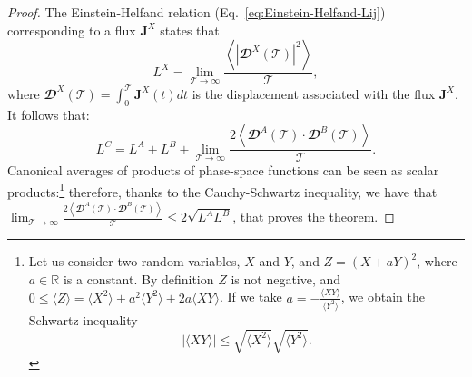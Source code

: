 \begin{proof}
The Einstein-Helfand relation (Eq.~\eqref{eq:Einstein-Helfand-Lij}) corresponding to a flux $\mathbf{J}^X$ states that 
\begin{equation}
    L^{X} = \lim_{\mathcal{T}\rightarrow\infty} \frac{\left\langle|\mathbfcal{D}^X(\mathcal{T})|^2\right\rangle} {\mathcal{T}},
\end{equation}
where $\mathbfcal{D}^X(\mathcal{T})=\int_0^{\mathcal{T}} \mathbf{J}^X(t) dt$ is the displacement associated with the flux $\mathbf{J}^X$. It follows that:
\begin{equation}
    L^{C} = L^{A} + L^{B} + \lim_{\mathcal{T}\rightarrow\infty} \frac{2\left\langle \mathbfcal{D}^A(\mathcal{T}) \cdot \mathbfcal{D}^B(\mathcal{T})\right\rangle}{\mathcal{T}}.
\end{equation}
Canonical averages of products of phase-space functions can be seen as scalar products:\footnote{Let us consider two random variables, $X$ and $Y$, and $Z=(X+aY)^2$, where $a\in \mathbb{R}$ is a constant. By definition $Z$ is not negative, and $0\leq \langle Z \rangle = \langle X^2 \rangle + a^2 \langle Y^2 \rangle + 2a \langle XY \rangle$. If we take $a = -\frac{\langle XY \rangle}{\langle Y^2 \rangle}$, we obtain the Schwartz inequality
\begin{equation} \label{eq:schwartz-ineq}
    |\langle XY \rangle| \leq \sqrt{\langle X^2 \rangle} \sqrt{\langle Y^2 \rangle}.
\end{equation}}
therefore, thanks to the Cauchy-Schwartz inequality, we have that $\lim_{\mathcal{T}\rightarrow\infty} \frac{2\left\langle \mathbfcal{D}^A(\mathcal{T}) \cdot \mathbfcal{D}^B(\mathcal{T})\right\rangle}{\mathcal{T}} \leq 2\sqrt{L^{A} L^{B}}$, that proves the theorem. 
\end{proof}

